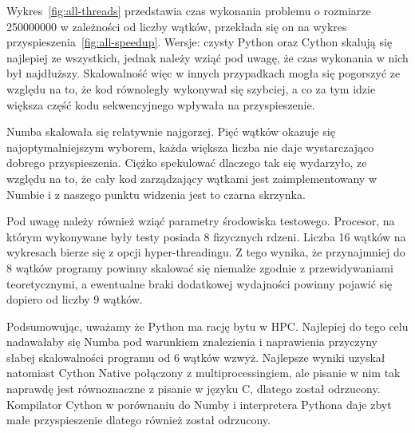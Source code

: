 Wykres~\ref{fig:all-threads} przedstawia czas wykonania problemu o rozmiarze
250000000 w zależności od liczby wątków,
przekłada się on na wykres przyspieszenia~\ref{fig:all-speedup}.
Wersje: czysty Python oraz Cython skalują się najlepiej ze wszystkich,
jednak należy wziąć pod uwagę, że czas wykonania w nich był najdłuższy.
Skalowalność więc w innych przypadkach mogła się pogorszyć ze względu na to,
że kod równoległy wykonywał się szybciej, a co za tym idzie większa
część kodu sekwencyjnego wpływała na przyspieszenie.

Numba skalowała się relatywnie najgorzej.
Pięć wątków okazuje się najoptymalniejszym wyborem,
każda większa liczba nie daje wystarczająco dobrego przyspieszenia.
Ciężko spekulować dlaczego tak się wydarzyło, ze względu na to,
że cały kod zarządzający wątkami jest zaimplementowany w Numbie
i z naszego punktu widzenia jest to czarna skrzynka.

Pod uwagę należy również wziąć parametry środowiska testowego.
Procesor, na którym wykonywane były testy posiada 8 fizycznych rdzeni.
Liczba 16 wątków na  wykresach bierze się z opcji hyper-threadingu.
Z tego wynika, że przynajmniej do 8 wątków programy powinny skalować się
niemalże zgodnie z przewidywaniami teoretycznymi, a ewentualne braki
dodatkowej wydajności powinny pojawić się dopiero od liczby 9 wątków.

Podsumowując, uważamy że Python ma rację bytu w HPC. Najlepiej do tego celu
nadawałaby się Numba pod warunkiem znalezienia i naprawienia przyczyny
słabej skalowalności programu od 6 wątków wzwyż. Najlepsze wyniki uzyskał natomiast
Cython Native połączony z multiprocessingiem, ale pisanie w nim tak naprawdę
jest równoznaczne z pisanie w języku C, dlatego został odrzucony. Kompilator Cython
w porównaniu do Numby i interpretera Pythona daje zbyt małe przyspieszenie
dlatego również został odrzucony.
